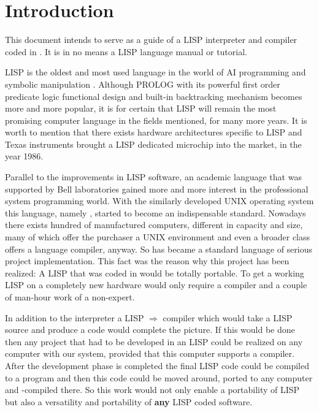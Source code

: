 \chapter{Introduction}
This  document  intends  to  serve  as  a  guide  of a LISP interpreter and
compiler coded in \C. It is in no means a LISP language manual or tutorial.


LISP  is  the  oldest and most used language in the world of AI programming
and symbolic manipulation . Although PROLOG with its powerful first  order
predicate  logic  functional  design  and  built-in  backtracking mechanism
becomes more and more popular, it is for certain that LISP will remain  the
most  promising  computer  language  in the fields mentioned, for many more
years. It is worth to mention  that  there  exists  hardware  architectures
specific  to  LISP and Texas instruments brought a LISP dedicated microchip
into the market, in the year 1986.

Parallel to the improvements in  LISP software, an academic  language  that
was  supported  by  Bell  laboratories  gained  more and more interest in the
professional system programming world. With the  similarly  developed  UNIX
operating   system   this   language,  namely  \C,  started  to  become  an
indispensable standard.  Nowadays  there  exists  hundred  of  manufactured
computers, different  in  capacity  and  size,  many  of  which  offer  the
purchaser  a UNIX environment and even a broader class offers a \C language
compiler, anyway. So \C has became a standard language of  serious  project
implementation. This fact was the reason why this project has been realized:
A  LISP  that  was  coded in \C would be totally portable. To get a working
LISP on a completely new hardware would only require a \C  compiler  and  a
couple of man-hour work of a non-expert.

In addition to the interpreter a LISP $\Rightarrow$ \C compiler which would
take  a  LISP  source  and produce a \C code would complete the picture. If
this would be done then any project that had to be  developed  in  an  LISP
could  be  realized  on  any  computer  with our system, provided that this
computer supports a \C compiler. After the development  phase  is  completed
the final LISP code could be compiled to a \C program and then this \C code
could  be  moved  around, ported to any computer and \CC-compiled there. So
this work  would  not  only  enable  a  portability  of  LISP  but  also  a
versatility and portability of {\bf any} LISP coded software.

